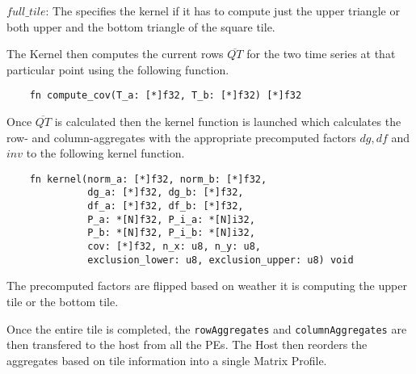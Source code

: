 \(full\_tile\): The specifies the kernel if it has to compute just the upper triangle or both upper and the bottom triangle of the square tile.

The Kernel then computes the current rows $\overline{QT}$ for the two time series at that particular point using the following function.

\begin{verbatim}
    fn compute_cov(T_a: [*]f32, T_b: [*]f32) [*]f32
\end{verbatim}

Once $\overline{QT}$ is calculated then the kernel function is launched which calculates the row- and column-aggregates with the appropriate precomputed factors $dg, df$ and $inv$ to the following kernel function.

\begin{verbatim}
    fn kernel(norm_a: [*]f32, norm_b: [*]f32,
              dg_a: [*]f32, dg_b: [*]f32,
              df_a: [*]f32, df_b: [*]f32,
              P_a: *[N]f32, P_i_a: *[N]i32,
              P_b: *[N]f32, P_i_b: *[N]i32,
              cov: [*]f32, n_x: u8, n_y: u8,
              exclusion_lower: u8, exclusion_upper: u8) void
\end{verbatim}



The precomputed factors are flipped based on weather it is computing the upper tile or the bottom tile.

Once the entire tile is completed, the \texttt{rowAggregates} and \texttt{columnAggregates} are then transfered to the host from all the PEs. The Host then reorders the aggregates based on tile information into a single Matrix Profile.